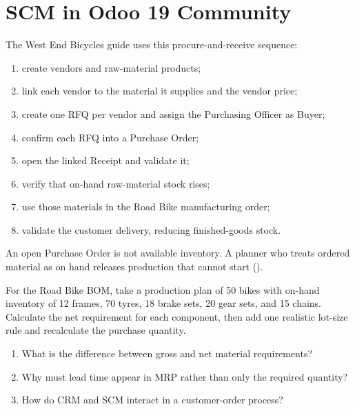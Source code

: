 \section{SCM in Odoo 19 Community}

\begin{odoobox}
The West End Bicycles guide uses this procure-and-receive sequence:
\begin{enumerate}
  \item create vendors and raw-material products;
  \item link each vendor to the material it supplies and the vendor price;
  \item create one RFQ per vendor and assign the Purchasing Officer as Buyer;
  \item confirm each RFQ into a Purchase Order;
  \item open the linked Receipt and validate it;
  \item verify that on-hand raw-material stock rises;
  \item use those materials in the Road Bike manufacturing order;
  \item validate the customer delivery, reducing finished-goods stock.
\end{enumerate}
\end{odoobox}

\begin{pitfall}
An open Purchase Order is not available inventory. A planner who treats ordered
material as on hand releases production that cannot start
().
\end{pitfall}

\begin{tryit}
For the Road Bike BOM, take a production plan of 50 bikes with on-hand inventory
of 12 frames, 70 tyres, 18 brake sets, 20 gear sets, and 15 chains. Calculate the
net requirement for each component, then add one realistic lot-size rule and
recalculate the purchase quantity.
\end{tryit}

\begin{quickcheck}
\begin{enumerate}
  \item What is the difference between gross and net material requirements?
  \item Why must lead time appear in MRP rather than only the required quantity?
  \item How do CRM and SCM interact in a customer-order process?
\end{enumerate}
\end{quickcheck}

